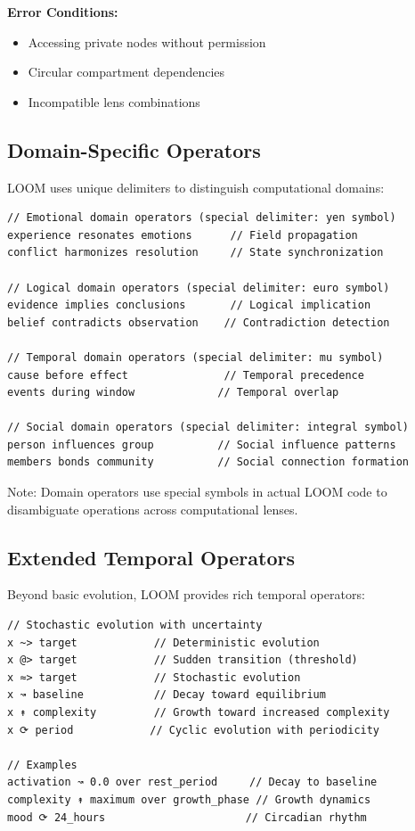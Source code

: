 \documentclass[12pt,a4paper,openany]{book} %
\begin{document}
\textbf{Error Conditions:}
\begin{itemize}
\item Accessing private nodes without permission
\item Circular compartment dependencies
\item Incompatible lens combinations
\end{itemize}

\subsection{Domain-Specific Operators}

LOOM uses unique delimiters to distinguish computational domains:

\vspace{0.5em}
\begin{lstlisting}[language=loom]
// Emotional domain operators (special delimiter: yen symbol)
experience resonates emotions      // Field propagation
conflict harmonizes resolution     // State synchronization

// Logical domain operators (special delimiter: euro symbol)
evidence implies conclusions       // Logical implication
belief contradicts observation    // Contradiction detection

// Temporal domain operators (special delimiter: mu symbol)
cause before effect               // Temporal precedence
events during window             // Temporal overlap

// Social domain operators (special delimiter: integral symbol)
person influences group          // Social influence patterns
members bonds community          // Social connection formation
\end{lstlisting}
\vspace{0.5em}

Note: Domain operators use special symbols in actual LOOM code to disambiguate operations across computational lenses.

\subsection{Extended Temporal Operators}

Beyond basic evolution, LOOM provides rich temporal operators:

\vspace{0.5em}
\begin{lstlisting}[language=loom]
// Stochastic evolution with uncertainty
x ~> target            // Deterministic evolution
x @> target            // Sudden transition (threshold)
x ≈> target            // Stochastic evolution
x ↝ baseline           // Decay toward equilibrium
x ↟ complexity         // Growth toward increased complexity
x ⟳ period            // Cyclic evolution with periodicity

// Examples
activation ↝ 0.0 over rest_period     // Decay to baseline
complexity ↟ maximum over growth_phase // Growth dynamics
mood ⟳ 24_hours                      // Circadian rhythm
\end{lstlisting}
\vspace{0.5em}
\end{document}
